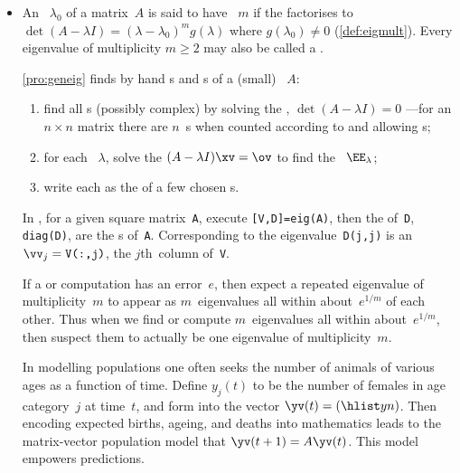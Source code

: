 \begin{itemize}
\item An ~\(\lambda_0\) of a matrix~\(A\) is said to have ~\(m\) if the  factorises to \(\det(A-\lambda I)=(\lambda-\lambda_0)^mg(\lambda)\) where \(g(\lambda_0)\neq0\) (\autoref{def:eigmult}).
Every eigenvalue of multiplicity \(m\geq2\) may also be called a .

\itemme \autoref{pro:geneig} finds by hand s and s of a (small) ~\(A\):
\begin{enumerate}
\item find all s (possibly complex) by solving the , \(\det(A-\lambda I)=0\) ---for an \(n\times n\) matrix there are \(n\)~s when counted according to  and allowing s;
\item for each ~\(\lambda\), solve the   \((A-\lambda I)\xv=\ov\) to find the ~\(\EE_\lambda\);
\item write each  as the  of a few chosen s.
\end{enumerate}

In \script, for a given square matrix~\verb|A|, execute 
\verb|[V,D]=eig(A)|, then the  of~\verb|D|, 
\verb|diag(D)|, are the s of~\verb|A|. 
Corresponding to the eigenvalue~\verb|D(j,j)| is an   \(\vv_j=\verb|V(:,j)|\), the \(j\)th~column of~\verb|V|.  

\itemme If a  or computation has an error~\(e\), then expect a repeated eigenvalue of multiplicity~\(m\) to appear as \(m\)~eigenvalues all within about~\(e^{1/m}\) of each other.
Thus when we find or compute \(m\)~eigenvalues all within about~\(e^{1/m}\), then suspect them to actually be one eigenvalue of multiplicity~\(m\).

\itemhi In modelling populations one often seeks the number of animals of various ages as a function of time.
Define \(y_j(t)\) to be the number of females in age category~\(j\) at time~\(t\), and form into the vector \(\yv(t)=(\hlist yn)\).
Then encoding expected births, ageing, and deaths into mathematics leads to the matrix-vector population model that \(\yv(t+1)=A\yv(t)\).
This model empowers predictions.



\end{itemize}
